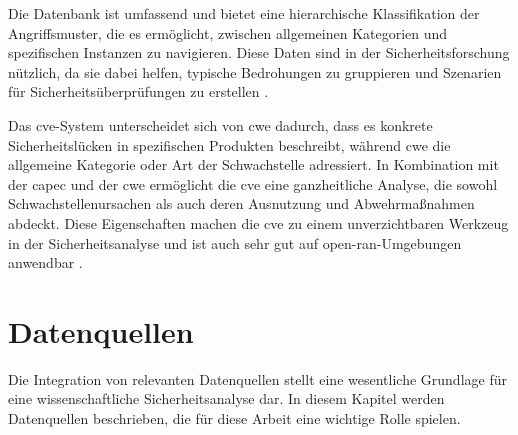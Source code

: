 Die Datenbank ist umfassend und bietet eine hierarchische Klassifikation der Angriffsmuster, die es ermöglicht, zwischen allgemeinen Kategorien und spezifischen Instanzen zu navigieren. Diese Daten sind in der Sicherheitsforschung nützlich, da sie dabei helfen, typische Bedrohungen zu gruppieren und Szenarien für Sicherheitsüberprüfungen zu erstellen \autocite{CAPECWebsite}.

\par Das \gls{cve}-System unterscheidet sich von \gls{cwe} dadurch, dass es konkrete Sicherheitslücken in spezifischen Produkten beschreibt, während \gls{cwe} die allgemeine Kategorie oder Art der Schwachstelle adressiert. In Kombination mit der \gls{capec} und der \gls{cwe} ermöglicht die \gls{cve} eine ganzheitliche Analyse, die sowohl Schwachstellenursachen als auch deren Ausnutzung und Abwehrmaßnahmen abdeckt. Diese Eigenschaften machen die \gls{cve} zu einem unverzichtbaren Werkzeug in der Sicherheitsanalyse und ist auch sehr gut auf \gls{open-ran}-Umgebungen anwendbar \cite{CVEWebsite}.

\section{Datenquellen}
\label{sec:datenquellen}
Die Integration von relevanten Datenquellen stellt eine wesentliche Grundlage für eine wissenschaftliche Sicherheitsanalyse dar. In diesem Kapitel werden Datenquellen beschrieben, die für diese Arbeit eine wichtige Rolle spielen.
